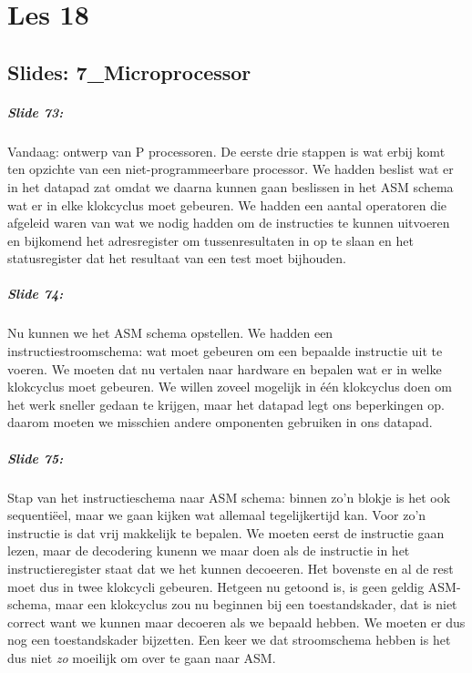 \documentclass[10pt,a4paper]{book}
\begin{document}
\chapter{Les 18}

\section{Slides: 7\_Microprocessor} 

\paragraph{Slide 73:} Vandaag: ontwerp van P processoren. De eerste drie stappen is wat erbij komt ten opzichte van een niet-programmeerbare processor. We hadden beslist wat er in het datapad zat omdat we daarna kunnen gaan beslissen in het ASM schema wat er in elke klokcyclus moet gebeuren. We hadden een aantal operatoren die afgeleid waren van wat we nodig hadden om de instructies te kunnen uitvoeren en bijkomend het adresregister om tussenresultaten in op te slaan en het statusregister dat het resultaat van een test moet bijhouden. 

\paragraph{Slide 74:} Nu kunnen we het ASM schema opstellen. We hadden een instructiestroomschema: wat moet gebeuren om een bepaalde instructie uit te voeren. We moeten dat nu vertalen naar hardware en bepalen wat er in welke klokcyclus moet gebeuren. We willen zoveel mogelijk in \'e\'en klokcyclus doen om het werk sneller gedaan te krijgen, maar het datapad legt ons beperkingen op. daarom moeten we misschien andere omponenten gebruiken in ons datapad.

\paragraph{Slide 75:} Stap van het instructieschema naar ASM schema: binnen zo'n blokje is het ook sequenti\"eel, maar we gaan kijken wat allemaal tegelijkertijd kan. Voor zo'n instructie is dat vrij makkelijk te bepalen. We moeten eerst de instructie gaan lezen, maar de decodering kunenn we maar doen als de instructie in het instructieregister staat dat we het kunnen decoeeren. Het bovenste en al de rest moet dus in twee klokcycli gebeuren. Hetgeen nu getoond is, is geen geldig ASM-schema, maar een klokcyclus zou nu beginnen bij een toestandskader, dat is niet correct want we kunnen maar decoeren als we bepaald hebben. We moeten er dus nog een toestandskader bijzetten. Een keer we dat stroomschema hebben is het dus niet \emph{zo} moeilijk om over te gaan naar ASM.
\end{document}
